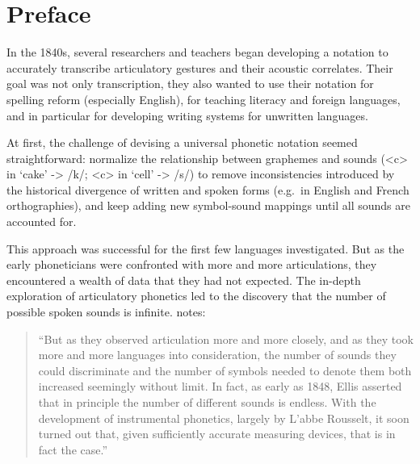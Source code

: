 \chapter{Preface}
\label{preface}



In the 1840s, several researchers and teachers began developing a notation to accurately transcribe articulatory gestures and their acoustic correlates. Their goal was not only transcription, they also wanted to use their notation for spelling reform (especially English), for teaching literacy and foreign languages, and in particular for developing writing systems for unwritten languages.

At first, the challenge of devising a universal phonetic notation seemed straightforward: normalize the relationship between graphemes and sounds (<c> in `cake' -> /k/; <c> in `cell' -> /s/) to remove inconsistencies introduced by the historical divergence of written and spoken forms (e.g.\ in English and French orthographies), and keep adding new symbol-sound mappings until all sounds are accounted for.


This approach was successful for the first few languages investigated. But as the early phoneticians were confronted with more and more articulations, they encountered a wealth of data that they had not expected. The in-depth exploration of articulatory phonetics led to the discovery that the number of possible spoken sounds is infinite. \cite{Hockett1995} notes:

\begin{quote}
``But as they observed articulation more and more closely, and as they took more and more languages into consideration, the number of sounds they could discriminate and the number of symbols needed to denote them both increased seemingly without limit. In fact, as early as 1848, Ellis asserted that in principle the number of different sounds is endless. With the development of instrumental phonetics, largely by L'abbe Rousselt, it soon turned out that, given sufficiently accurate measuring devices, that is in fact the case.''
\end{quote}

